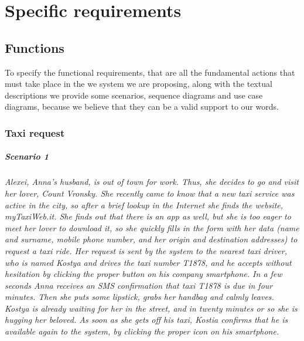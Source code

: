 \chapter{Specific requirements}\label{chap:requirements}


\section{Functions}
To specify the functional requirements, that are all the fundamental actions that must take place in the we system we are proposing, along with the textual descriptions we provide some scenarios, sequence diagrams and use case diagrams, because we believe that they can be a valid support to our words.


\subsection{Taxi request}\label{subsec:taxiRequest}


\paragraph{Scenario 1}{\small\itshape Alexei, Anna's husband, is out of town for work. Thus, she decides to go and visit her lover, Count Vronsky. She recently came to know that a new taxi service was active in the city, so after a brief lookup in the Internet she finds the website, myTaxiWeb.it. She finds out that there is an app as well, but she is too eager to meet her lover to download it, so she quickly fills in the form with her data (name and surname, mobile phone number, and her origin and destination addresses) to request a taxi ride. Her request is sent by the system to the nearest taxi driver, who is named Kostya and drives the taxi number T1878, and he accepts without hesitation by clicking the proper button on his company smartphone. In a few seconds Anna receives an SMS confirmation that taxi T1878 is due in four minutes. Then she puts some lipstick, grabs her handbag and calmly leaves. Kostya is already waiting for her in the street, and in twenty minutes or so she is hugging her beloved. As soon as she gets off his taxi, Kostia confirms that he is available again to the system, by clicking the proper icon on his smartphone.}


